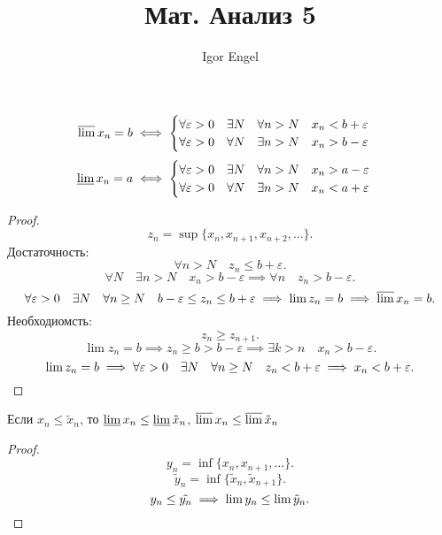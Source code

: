 \documentclass[11pt, oneside]{article}   	%
\title{Мат. Анализ 5}
\author{Igor Engel}
\date{}
\begin{document}
\maketitle
\section{}
    \begin{theorem}
        \begin{equation*}
            \varlimsup x_n = b \iff \begin{cases}
                \forall{\varepsilon > 0}\quad \exists{N}\quad \forall{n > N}\quad x_n < b + \varepsilon\\
                \forall{\varepsilon > 0}\quad \forall{N}\quad \exists{n > N}\quad x_n > b - \varepsilon
            \end{cases}
        \end{equation*}
        \begin{equation*}
            \varliminf x_n = a \iff \begin{cases}
                \forall{\varepsilon > 0}\quad \exists{N}\quad \forall{n > N}\quad x_n > a - \varepsilon\\
                \forall{\varepsilon > 0}\quad \forall{N}\quad \exists{n > N}\quad x_n < a + \varepsilon
            \end{cases}
        \end{equation*}
        \begin{proof}
            \[ z_n = \sup \{x_n, x_{n+1}, x_{n+2}, \ldots\}  .\]
            Достаточность:
            \[ \forall{n > N}\quad z_n \le b+\varepsilon .\]
            \[ \forall{N} \quad \exists{n > N}\quad x_n > b - \varepsilon \implies \forall{n}\quad  z_n > b - \varepsilon .\] 
            \[ \forall{\varepsilon > 0}\quad \exists{N}\quad \forall{n \ge N}\quad b-\varepsilon \le  z_n \le b+\varepsilon \implies \lim z_n = b \implies \varlimsup x_n = b .\]
            Необходиомсть:
            \[ z_n \ge z_{n+1} .\] 
            \[ \lim z_n = b \implies z_n \ge b > b-\varepsilon \implies \exists{k > n}\quad x_n > b-\varepsilon .\]
            \[ \lim z_n = b \implies \forall{\varepsilon > 0}\quad \exists{N}\quad \forall{n \ge N}\quad z_n < b+\varepsilon \implies x_n < b+\varepsilon .\qedhere\] 
        \end{proof}
    \end{theorem}    
    \begin{theorem}
        Если $x_n \le \tilde{x}_n$, то $\varliminf x_n \le \varliminf\tilde{x}_n$, $\varlimsup x_n \le  \varlimsup \tilde{x}_n$
        \begin{proof}
            \[ y_n =\inf \{x_n, x_{n+1}, \ldots\}  .\]
            \[ \tilde{y}_n = \inf \{\tilde{x}_n, \tilde{x}_{n+1}\}  .\]
            \[ y_n \le \tilde{y_n} \implies \lim y_n \le \lim \tilde{y}_n .\qedhere\] 
        \end{proof}
    \end{theorem}
\end{document}
